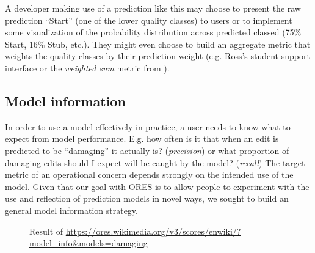 A developer making use of a prediction like this may choose to present the raw prediction ``Start'' (one of the lower quality classes) to users or to implement some visualization of the probability distribution across predicted classed (75\% Start, 16\% Stub, etc.).  They might even choose to build an aggregate metric that weights the quality classes by their prediction weight (e.g. Ross's student support interface\cite{ross2016visualizing} or the \emph{weighted sum} metric from \cite{halfaker2017interpolating}).

\subsection{Model information}
In order to use a model effectively in practice, a user needs to know what to expect from model performance.  E.g. how often is it that when an edit is predicted to be ``damaging'' it actually is? (\emph{precision}) or what proportion of damaging edits should I expect will be caught by the model? (\emph{recall})  The target metric of an operational concern depends strongly on the intended use of the model.  Given that our goal with ORES is to allow people to experiment with the use and reflection of prediction models in novel ways, we sought to build an general model information strategy.

\begin{figure}[htbp]
        \caption{Result of \url{https://ores.wikimedia.org/v3/scores/enwiki/?model_info&models=damaging}}
        \label{fig:english_damaging_model_info}
\end{figure}

